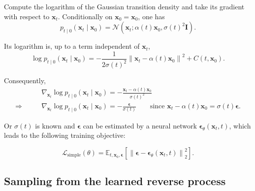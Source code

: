 \begin{compactproof}[title={Proof}]
Compute the logarithm of the Gaussian transition density and take its gradient with respect to $\mathbf{x}_t$.
Conditionally on $\mathbf{x}_0=\mathbf{x}_0$, one has
\begin{equation*}
p_{t\mid 0}(\mathbf{x}_t\mid\mathbf{x}_0)
=
\mathcal{N}
\left(
\mathbf{x}_t;
\alpha(t)\mathbf{x}_0,
\sigma(t)^2\mathbf{I}
\right).
\end{equation*}

Its logarithm is, up to a term independent of $\mathbf{x}_t$,
\begin{equation*}
\log p_{t\mid 0}(\mathbf{x}_t\mid\mathbf{x}_0)
=
-\frac{1}{2\sigma(t)^2}
\left\|
\mathbf{x}_t-\alpha(t)\mathbf{x}_0
\right\|^2
+
C(t,\mathbf{x}_0).
\end{equation*}

Consequently,
\begin{align*}
&\nabla_{\mathbf{x}_t}
\log p_{t\mid 0}(\mathbf{x}_t\mid\mathbf{x}_0)
=
-\frac{
\mathbf{x}_t-\alpha(t)\mathbf{x}_0
}{
\sigma(t)^2
}
\\
\Rightarrow\qquad
&
\boxed{
\nabla_{\mathbf{x}_t}
\log p_{t\mid 0}(\mathbf{x}_t\mid\mathbf{x}_0)
=
-\frac{\boldsymbol{\epsilon}}{\sigma(t)}
}
\qquad
{\scriptstyle
\text{since }
\mathbf{x}_t-\alpha(t)\mathbf{x}_0
=
\sigma(t)\boldsymbol{\epsilon}.
}
\end{align*}

\end{compactproof}

Or $\sigma(t)$ is known and $\boldsymbol{\epsilon}$ can be estimated by a neural network $\boldsymbol{\epsilon}_{\theta}(\mathbf{x}_t,t)$, which leads to the following training objective:

\begin{equation}
    \boxed{
    \mathcal{L}_{\mathrm{simple}}(\theta)
    =
    \mathbb{E}_{t,\mathbf{x}_0,\boldsymbol{\epsilon}}
    \left[
        \left\|
            \boldsymbol{\epsilon}
            -
            \boldsymbol{\epsilon}_{\theta}(\mathbf{x}_t,t)
        \right\|_2^2
    \right].
    }
    \label{eq:simple_noise_loss}
\end{equation}


\subsection{Sampling from the learned reverse process}
\label{subsec:sampling_reverse_process}

